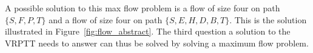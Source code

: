 
%


A possible solution to this max flow problem is a flow of size four on path $\{S,F,P,T\}$ and a flow of size four on path $\{S,E,H,D,B,T\}$. This is the solution illustrated in Figure~\ref{fig:flow_abstract}.
The third question a solution to the VRPTT needs to answer can thus be solved by solving a maximum flow problem.
\\

